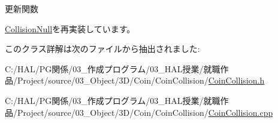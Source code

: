 更新関数 



\mbox{\hyperlink{class_collision_null_a5e5e094e3fbe3ccc0515e485c739bd15}{Collision\+Null}}を再実装しています。



このクラス詳解は次のファイルから抽出されました\+:\begin{DoxyCompactItemize}
\item 
C\+:/\+H\+A\+L/\+P\+G関係/03\+\_\+作成プログラム/03\+\_\+\+H\+A\+L授業/就職作品/\+Project/source/03\+\_\+\+Object/3\+D/\+Coin/\+Coin\+Collision/\mbox{\hyperlink{_coin_collision_8h}{Coin\+Collision.\+h}}\item 
C\+:/\+H\+A\+L/\+P\+G関係/03\+\_\+作成プログラム/03\+\_\+\+H\+A\+L授業/就職作品/\+Project/source/03\+\_\+\+Object/3\+D/\+Coin/\+Coin\+Collision/\mbox{\hyperlink{_coin_collision_8cpp}{Coin\+Collision.\+cpp}}\end{DoxyCompactItemize}
